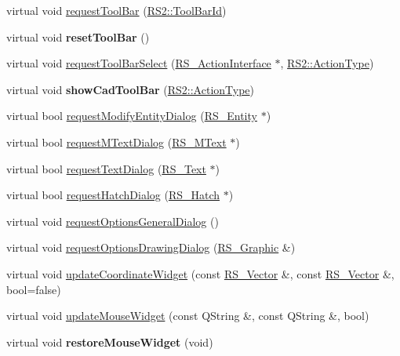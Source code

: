 \begin{DoxyCompactItemize}
\item 
virtual void \hyperlink{classRS__DialogFactoryAdapter_acc8be1beb1d13bec9e224884aeca1329}{request\-Tool\-Bar} (\hyperlink{classRS2_a53db3c150d1d8d501b236d537de53793}{R\-S2\-::\-Tool\-Bar\-Id})
\item 
\hypertarget{classRS__DialogFactoryAdapter_ab8beeb8c08241bd6492ef8b7993aa242}{virtual void {\bfseries reset\-Tool\-Bar} ()}\label{classRS__DialogFactoryAdapter_ab8beeb8c08241bd6492ef8b7993aa242}

\item 
virtual void \hyperlink{classRS__DialogFactoryAdapter_ad2a16728849c02e064355fce2c37acde}{request\-Tool\-Bar\-Select} (\hyperlink{classRS__ActionInterface}{R\-S\-\_\-\-Action\-Interface} $\ast$, \hyperlink{classRS2_afe3523e0bc41fd637b892321cfc4b9d7}{R\-S2\-::\-Action\-Type})
\item 
\hypertarget{classRS__DialogFactoryAdapter_a61e0c40e5f0cc94d1f5a9a146184dc46}{virtual void {\bfseries show\-Cad\-Tool\-Bar} (\hyperlink{classRS2_afe3523e0bc41fd637b892321cfc4b9d7}{R\-S2\-::\-Action\-Type})}\label{classRS__DialogFactoryAdapter_a61e0c40e5f0cc94d1f5a9a146184dc46}

\item 
virtual bool \hyperlink{classRS__DialogFactoryAdapter_a631d4544515662a2043b42663530b184}{request\-Modify\-Entity\-Dialog} (\hyperlink{classRS__Entity}{R\-S\-\_\-\-Entity} $\ast$)
\item 
virtual bool \hyperlink{classRS__DialogFactoryAdapter_a20cf63f417b161b73f31b59f74e03c79}{request\-M\-Text\-Dialog} (\hyperlink{classRS__MText}{R\-S\-\_\-\-M\-Text} $\ast$)
\item 
virtual bool \hyperlink{classRS__DialogFactoryAdapter_ab98dd62d8c2d0b64282c7d075bd09f2a}{request\-Text\-Dialog} (\hyperlink{classRS__Text}{R\-S\-\_\-\-Text} $\ast$)
\item 
virtual bool \hyperlink{classRS__DialogFactoryAdapter_a871708bf09cf63f5d15a0530582e72cb}{request\-Hatch\-Dialog} (\hyperlink{classRS__Hatch}{R\-S\-\_\-\-Hatch} $\ast$)
\item 
virtual void \hyperlink{classRS__DialogFactoryAdapter_a5791aef555cc797155bae9f91689004f}{request\-Options\-General\-Dialog} ()
\item 
virtual void \hyperlink{classRS__DialogFactoryAdapter_a3966708a65dcb5b0345f83d765ba8c68}{request\-Options\-Drawing\-Dialog} (\hyperlink{classRS__Graphic}{R\-S\-\_\-\-Graphic} \&)
\item 
virtual void \hyperlink{classRS__DialogFactoryAdapter_a6ec328960a41f3695cc95087364cb11e}{update\-Coordinate\-Widget} (const \hyperlink{classRS__Vector}{R\-S\-\_\-\-Vector} \&, const \hyperlink{classRS__Vector}{R\-S\-\_\-\-Vector} \&, bool=false)
\item 
virtual void \hyperlink{classRS__DialogFactoryAdapter_ae3a357e880ccf8b33a18b24ece06fea3}{update\-Mouse\-Widget} (const Q\-String \&, const Q\-String \&, bool)
\item 
\hypertarget{classRS__DialogFactoryAdapter_adc278fa679d78eb0b1649e10c526370a}{virtual void {\bfseries restore\-Mouse\-Widget} (void)}\label{classRS__DialogFactoryAdapter_adc278fa679d78eb0b1649e10c526370a}


\end{DoxyCompactItemize}
